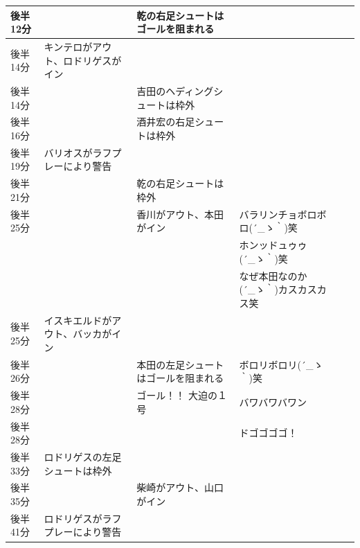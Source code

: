 \begin{table}[htb]
{\begin{tabular}{|l|l|l|l|l|l|}
      後半12分  &                                              & 乾の右足シュートはゴールを阻まれる    & \\ \hline
      後半14分  & キンテロがアウト、ロドリゲスがイン           &                                       & \\ \hline
      後半14分  &                                              & 吉田のヘディングシュートは枠外        &      \\ \hline
      後半16分  &                                              & 酒井宏の右足シュートは枠外            &   \\ \hline
      後半19分  & バリオスがラフプレーにより警告               &                                       &  \\ \hline
      後半21分  &                                              & 乾の右足シュートは枠外                & \\ \hline
      後半25分  &                                              & 香川がアウト、本田がイン              & バラリンチョボロボロ\sf (´\_ゝ｀)笑 \\ \hline
                &                                              &                                       & ホンッドュゥゥ\sf (´\_ゝ｀)笑 \\ \hline
                &                                              &                                       & なぜ本田なのか\sf (´\_ゝ｀)カスカスカス笑 \\ \hline
      後半25分  & イスキエルドがアウト、バッカがイン           &                                       &  \\ \hline
      後半26分  &                                              & 本田の左足シュートはゴールを阻まれる  & ボロリボロリ\sf (´\_ゝ｀)笑\\ \hline
      後半28分  &                                              & ゴール！！ 大迫の１号                 & バワバワバワン  \\ \hline
      後半28分  &                                              &                                       & ドゴゴゴゴ！ \\ \hline
      後半33分  & ロドリゲスの左足シュートは枠外               &                                       &   \\ \hline
      後半35分  &                                              & 柴崎がアウト、山口がイン              &   \\ \hline
      後半41分  & ロドリゲスがラフプレーにより警告             &                                       &   \\ \hline

\end{tabular}}
\end{table}
